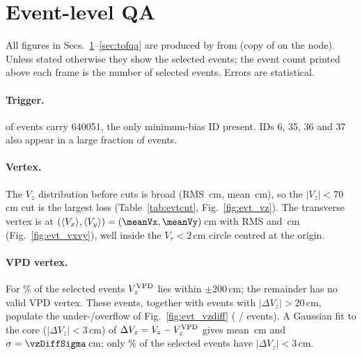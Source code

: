 \section{Event-level QA}
\label{sec:evtqa}
All figures in Secs.~\ref{sec:evtqa}--\ref{sec:tofqa} are produced by
 from  (copy of
 on the node). Unless stated otherwise they show the
\nEvtSel{} selected events; the event count printed above each frame is the number of selected events.
Errors are statistical.

\begin{table}[h]
\centering
\caption{Event cut flow for the test sample (; generated table ).}
\label{tab:evtcut}

\end{table}

\begin{table}[h]
\centering
\caption{Trigger IDs stored in the picoDst for all \nEvtAll{} events read (an event can carry several).
IDs with fewer than 50 events are summed. \nTrigIds{} distinct IDs occur in total
(full list in ).}
\label{tab:trigger}

\end{table}

\paragraph{Trigger.} \nEvtTrig{} of \nEvtAll{} events carry 640051, the only minimum-bias ID present.
IDs 6, 35, 36 and 37 also appear in a large fraction of events.

\paragraph{Vertex.} The $V_z$ distribution before cuts is broad (RMS \rmsVzAll\,cm, mean \meanVzAll\,cm),
so the $|V_z|<70$\,cm cut is the largest loss (Table~\ref{tab:evtcut}, Fig.~\ref{fig:evt_vz}).
The transverse vertex is at $(\langle V_x\rangle,\langle V_y\rangle)=(\meanVx,\meanVy)$\,cm with RMS
\rmsVx{} and \rmsVy\,cm (Fig.~\ref{fig:evt_vxvy}), well inside the $V_r<2$\,cm circle centred at the origin.

\paragraph{VPD vertex.} For \fracVpdValid\% of the selected events $V_z^{\rm VPD}$ lies within $\pm200$\,cm;
the remainder has no valid VPD vertex. These events, together with events with
$|\Delta V_z|>20$\,cm, populate the under-/overflow of Fig.~\ref{fig:evt_vzdiff} (\nVzDiffUnder{} / \nVzDiffOver{} events). A Gaussian fit to the core ($|\Delta V_z|<3$\,cm) of
$\Delta V_z = V_z-V_z^{\rm VPD}$ gives mean \vzDiffMean\,cm and $\sigma=\vzDiffSigma$\,cm;
only \fracVzDiffThree\% of the selected events have $|\Delta V_z|<3$\,cm.

